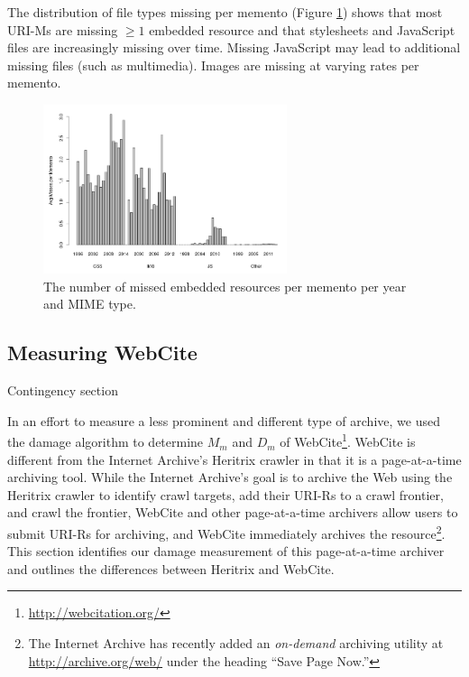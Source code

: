 The distribution of file types missing per memento (Figure \ref{occstats}) shows that most URI-Ms are missing $\ge 1$ embedded resource and that stylesheets and JavaScript files are increasingly missing over time. Missing JavaScript may lead to additional missing files (such as multimedia). Images are missing at varying rates per memento.

\begin{figure}[h!]
\includegraphics[width=270px]{./imgs/fileTypes.png}
\caption{The number of missed embedded resources per memento per year and MIME type.
}
\label{occstats}
\end{figure}



\subsection{Measuring WebCite}
\label{webcite}
{\color{red}Contingency section}

In an effort to measure a less prominent and different type of archive, we used the damage algorithm to determine $M_m$ and $D_m$ of WebCite\footnote{\url{http://webcitation.org/}}\cite{webcite}. WebCite is different from the Internet Archive's Heritrix crawler in that it is a page-at-a-time archiving tool. While the Internet Archive's goal is to archive the Web using the Heritrix crawler to identify crawl targets, add their URI-Rs to a crawl frontier, and crawl the frontier, WebCite and other page-at-a-time archivers allow users to submit URI-Rs for archiving, and WebCite immediately archives the resource\footnote{The Internet Archive has recently added an \emph{on-demand} archiving utility at \url{http://archive.org/web/} under the heading ``Save Page Now.''}. This section identifies our damage measurement of this page-at-a-time archiver and outlines the differences between Heritrix and WebCite. 

